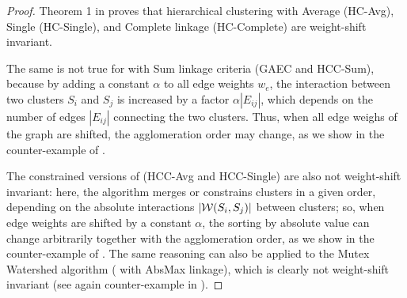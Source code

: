 \invariantAlgs*
\begin{proof}
Theorem 1 in \cite{chehreghani2020hierarchical} proves that hierarchical clustering with Average (HC-Avg), Single (HC-Single), and Complete linkage (HC-Complete) are weight-shift invariant.

The same is not true for \algname{} with Sum linkage criteria (GAEC and HCC-Sum), because by adding a constant $\alpha$ to all edge weights $w_e$, the interaction between two clusters $S_i$ and $S_j$ is increased by a factor $\alpha |E_{ij}|$, which depends on the number of edges  $|E_{ij}|$ connecting the two clusters. Thus, when all edge weighs of the graph are shifted, the agglomeration order may change, as we show in the counter-example of .


The constrained versions of \algname{} (HCC-Avg and HCC-Single) are also not weight-shift invariant: here, the algorithm merges or constrains clusters in a given order, depending on the absolute interactions $|\mathcal{W}{}(S_i, S_j)|$ between clusters; so, when edge weights are shifted by a constant $\alpha$, the sorting by absolute value can change arbitrarily together with the agglomeration order, as we show in the counter-example of .
The same reasoning can also be applied to the Mutex Watershed algorithm (\algname{} with AbsMax linkage), which is clearly not weight-shift invariant (see again counter-example in ).
\end{proof}



